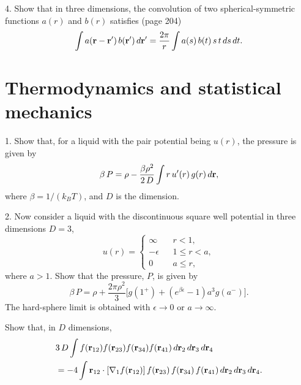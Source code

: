 \documentclass[12pt]{book}
\begin{document}
4. Show that in three dimensions,
the convolution of
two spherical-symmetric functions $a(r)$ and $b(r)$
satisfies\cite{hill} (page 204)
\[
  \int a(\boldsymbol{\mathbf{r}} - \boldsymbol{\mathbf{r}}') \, b(\boldsymbol{\mathbf{r}}') \, d\boldsymbol{\mathbf{r}}'
=
  \frac{2\pi}{r} \int a(s) \, b(t) \, s \, t \, ds \, dt.
\]



\chapter{Thermodynamics and statistical mechanics}



1. Show that, for a liquid with the pair potential being $u(r)$,
the pressure is given by
\begin{equation}
  \beta \, P = \rho - \frac{\beta \rho^2} {2\, D} \int r \, u'(r) \, g(r) \, d\boldsymbol{\mathbf{r}},
\end{equation}
where $\beta = 1/(k_BT)$, and $D$ is the dimension.

2. Now consider a liquid with the discontinuous square well potential
in three dimensions $D = 3$,
\begin{equation}
  u(r) =
  \begin{cases}
    \infty      \quad   & r < 1,          \\
    -\epsilon           & 1 \le r < a,    \\
    0                   & a \le r,
  \end{cases}
\end{equation}
where $a > 1$.
%
Show that the pressure, $P$, is given by
\begin{equation}
  \beta \, P = \rho
            + \frac{2 \pi \rho^2}{3}
              \big[g(1^+)
              + (e^{\beta \epsilon} - 1) a^3 g(a^-)\big].
\end{equation}
%
The hard-sphere limit is obtained with $\epsilon \rightarrow 0$
or $a \rightarrow \infty$.




Show that, in $D$ dimensions,
\begin{align*}
  &
  3 \, D
  \int
  f(\boldsymbol{\mathbf{r}}_{12}) f(\boldsymbol{\mathbf{r}}_{23}) f(\boldsymbol{\mathbf{r}}_{34}) f(\boldsymbol{\mathbf{r}}_{41})
  \, d\boldsymbol{\mathbf{r}}_2 \, d\boldsymbol{\mathbf{r}}_3 \, d\boldsymbol{\mathbf{r}}_4 \\
  &=
  -4 \int
  \boldsymbol{\mathbf{r}}_{12} \cdot [\nabla_1 f(\boldsymbol{\mathbf{r}}_{12})]
  \, f(\boldsymbol{\mathbf{r}}_{23}) \, f(\boldsymbol{\mathbf{r}}_{34}) \, f(\boldsymbol{\mathbf{r}}_{41})
  \, d\boldsymbol{\mathbf{r}}_2 \, d\boldsymbol{\mathbf{r}}_3 \, d\boldsymbol{\mathbf{r}}_4.
\end{align*}
\end{document}
